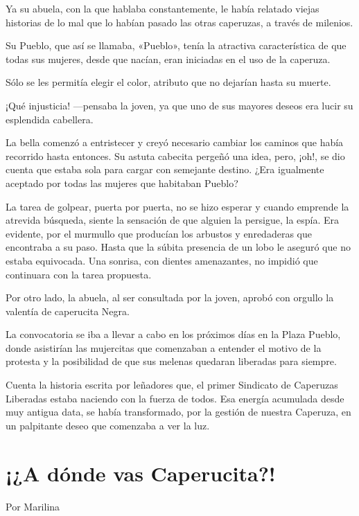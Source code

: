 \documentclass[11pt,twoside,openright,a5paper]{book}
\begin{document}
Ya su abuela, con la que hablaba constantemente, le había relatado viejas historias de lo mal que lo habían pasado las otras caperuzas, a través de milenios.

Su Pueblo, que así se llamaba, «Pueblo», tenía la atractiva característica de que todas sus mujeres, desde que nacían, eran iniciadas en el uso de la caperuza.

Sólo se les permitía elegir el color, atributo que no dejarían hasta su muerte.

¡Qué injusticia! ---pensaba la joven, ya que uno de sus mayores deseos era lucir su esplendida cabellera.

La bella comenzó a entristecer y creyó necesario cambiar los caminos que había recorrido hasta entonces.
Su astuta cabecita pergeñó una idea, pero, ¡oh!, se dio cuenta que estaba sola para cargar con semejante destino. ¿Era igualmente aceptado por todas las mujeres que habitaban Pueblo?

La tarea de golpear, puerta por puerta, no se hizo esperar y cuando emprende la atrevida búsqueda, siente la sensación de que alguien la persigue, la espía. Era evidente, por el murmullo que producían los arbustos y enredaderas que encontraba a su paso. Hasta que la súbita presencia de un lobo le aseguró que no estaba equivocada. Una sonrisa, con dientes amenazantes, no impidió que continuara con la tarea propuesta.

Por otro lado, la abuela, al ser consultada por la joven, aprobó con orgullo la valentía de caperucita Negra.

La convocatoria se iba a llevar a cabo en los próximos días en la Plaza Pueblo, donde asistirían las mujercitas que comenzaban a entender el motivo de la protesta y la posibilidad de que sus melenas quedaran liberadas para siempre.

Cuenta la historia escrita por leñadores que, el primer Sindicato de Caperuzas Liberadas estaba naciendo con la fuerza de todos. Esa energía acumulada desde muy antigua data, se había transformado, por la gestión de nuestra Caperuza, en un palpitante deseo que comenzaba a ver la luz.


\section*{¡¿A dónde vas Caperucita?!}

\begin{flushright}Por Marilina\end{flushright}
\end{document}
